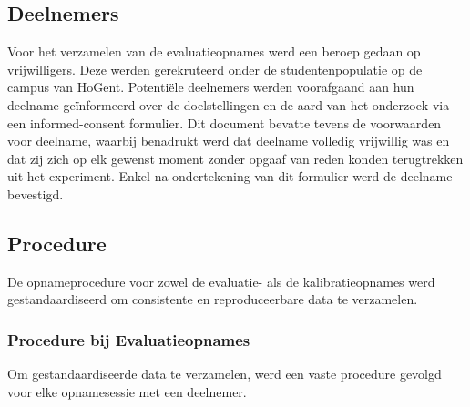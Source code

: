 \subsection{Deelnemers}

Voor het verzamelen van de evaluatieopnames werd een beroep gedaan op vrijwilligers. 
Deze werden gerekruteerd onder de studentenpopulatie op de campus van HoGent. 
Potentiële deelnemers werden voorafgaand aan hun deelname geïnformeerd over de doelstellingen en de aard van het onderzoek 
via een informed-consent formulier. Dit document bevatte tevens de voorwaarden voor deelname, 
waarbij benadrukt werd dat deelname volledig vrijwillig was en dat zij zich op elk gewenst moment zonder 
opgaaf van reden konden terugtrekken uit het experiment. 
Enkel na ondertekening van dit formulier werd de deelname bevestigd.

\subsection{Procedure}

De opnameprocedure voor zowel de evaluatie- als de kalibratieopnames werd gestandaardiseerd om consistente en reproduceerbare data te verzamelen.

\subsubsection{Procedure bij Evaluatieopnames}

Om gestandaardiseerde data te verzamelen, werd een vaste procedure gevolgd voor elke opnamesessie met een deelnemer.

